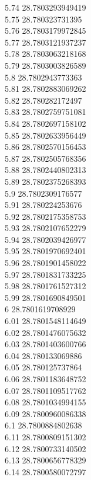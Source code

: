 {5.74	28.7803293949419\\
5.75	28.780323731395\\
5.76	28.7803179972845\\
5.77	28.7803121937237\\
5.78	28.7803063218168\\
5.79	28.7803003826589\\
5.8	28.7802943773363\\
5.81	28.7802883069262\\
5.82	28.780282172497\\
5.83	28.7802759751081\\
5.84	28.7802697158102\\
5.85	28.7802633956449\\
5.86	28.7802570156453\\
5.87	28.7802505768356\\
5.88	28.7802440802313\\
5.89	28.7802375268393\\
5.9	28.7802309176577\\
5.91	28.780224253676\\
5.92	28.7802175358753\\
5.93	28.7802107652279\\
5.94	28.7802039426977\\
5.95	28.7801970692401\\
5.96	28.7801901458022\\
5.97	28.7801831733225\\
5.98	28.7801761527312\\
5.99	28.7801690849501\\
6	28.7801619708929\\
6.01	28.7801548114649\\
6.02	28.7801476075632\\
6.03	28.7801403600766\\
6.04	28.780133069886\\
6.05	28.780125737864\\
6.06	28.7801183648752\\
6.07	28.7801109517762\\
6.08	28.7801034994155\\
6.09	28.7800960086338\\
6.1	28.7800884802638\\
6.11	28.7800809151302\\
6.12	28.7800733140502\\
6.13	28.7800656778329\\
6.14	28.7800580072797\\
}
